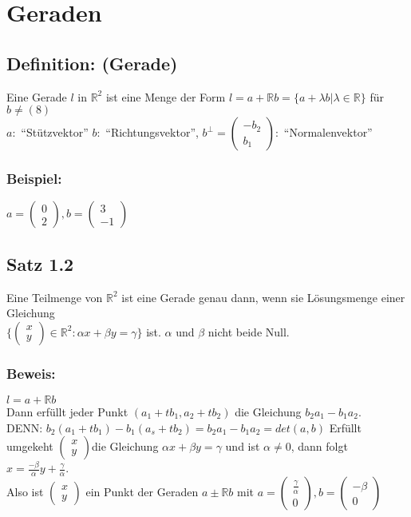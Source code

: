 \section{Geraden}
\subsection{Definition: (Gerade)}
Eine Gerade $l$ in $\mathbb{R}^{2}$ ist eine Menge der Form $l=a+\mathbb{R}b=\{a+\lambda b|\lambda \in \mathbb{R}\}$ für $b \neq (8)$\\
$a:$ "`Stützvektor"' \quad $b:$ "`Richtungsvektor"', \quad $b^{\perp}=\begin{pmatrix}-b_{2} \\ b_{1} \end{pmatrix}:$ "`Normalenvektor"'
%
\subsubsection{Beispiel: }
$a=\begin{pmatrix} 0 \\ 2 \end{pmatrix}, b=\begin{pmatrix} 3 \\ -1 \end{pmatrix}$
%
%
%
%
\subsection{Satz 1.2}
Eine Teilmenge von $\mathbb{R}^{2}$ ist eine Gerade genau dann, wenn sie Lösungsmenge einer Gleichung \\
$\{\begin{pmatrix}x \\ y \end{pmatrix} \in \mathbb{R}^{2} : \alpha x + \beta y = \gamma\}$ ist. $\alpha$ und $\beta$ nicht beide Null.
%
\subsubsection{Beweis:}
$l=a + \mathbb{R}b$\\
Dann erfüllt jeder Punkt $(a_{1}+tb_{1},a_{2}+tb_{2})$ die Gleichung $b_{2}a_{1}-b_{1}a_{2}$.\\
DENN:  $b_{2}(a_{1}+tb_{1})-b_{1}(a_{s}+tb_{2})=b_{2}a_{1}-b_{1}a_{2}=det(a,b)$ Erfüllt umgekeht $\begin{pmatrix}x \\ y \end{pmatrix}$die Gleichung $\alpha x + \beta y = \gamma$ und ist $\alpha \neq 0$, dann folgt $x=\frac{-\beta}{\alpha}y+\frac{\gamma}{\alpha}$. \\ 
Also ist $\begin{pmatrix}x \\ y \end{pmatrix}$ ein Punkt der Geraden $a \pm \mathbb{R}b$ mit $a=\begin{pmatrix} \frac{\gamma}{\alpha} \\ 0 \end{pmatrix}, b=\begin{pmatrix} -\beta \\ 0 \end{pmatrix}$\\
%
